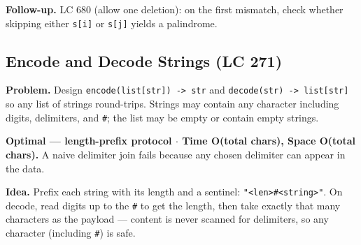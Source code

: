 \documentclass[11pt]{article}
\begin{document}
\textbf{Follow-up.} LC 680 (allow one deletion): on the first mismatch, check whether skipping either \texttt{s{[}i{]}} or \texttt{s{[}j{]}} yields a palindrome.

\subsection{Encode and Decode Strings (LC 271)}\label{encode-and-decode-strings-lc-271}

\textbf{Problem.} Design \texttt{encode(list{[}str{]})\ -\textgreater{}\ str} and \texttt{decode(str)\ -\textgreater{}\ list{[}str{]}} so any list of strings round-trips. Strings may contain any character including digits, delimiters, and \texttt{\#}; the list may be empty or contain empty strings.

\textbf{Optimal --- length-prefix protocol \(\cdot\) Time O(total chars), Space O(total chars).} A naive delimiter join fails because any chosen delimiter can appear in the data.

\textbf{Idea.} Prefix each string with its length and a sentinel: \texttt{"\textless{}len\textgreater{}\#\textless{}string\textgreater{}"}. On decode, read digits up to the \texttt{\#} to get the length, then take exactly that many characters as the payload --- content is never scanned for delimiters, so any character (including \texttt{\#}) is safe.

\end{document}
